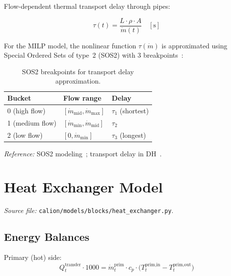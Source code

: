\documentclass[a4paper,12pt]{article}
\begin{document}
Flow-dependent thermal transport delay through pipes:

\begin{equation}
  \tau(t) = \frac{L \cdot \rho \cdot A}{\dot{m}(t)}
  \quad [\text{s}]
  \tag{PH-7}
  \label{eq:ph7}
\end{equation}

For the MILP model, the nonlinear function $\tau(\dot{m})$ is approximated using Special
Ordered Sets of type~2 (SOS2) with 3 breakpoints~\cite{Williams2013}:

\begin{table}[h!]
  \centering
  \caption{SOS2 breakpoints for transport delay approximation.}
  \begin{tabular}{@{}lll@{}}
    \toprule
    Bucket & Flow range & Delay \\
    \midrule
    0 (high flow)   & $[\dot{m}_{\text{mid}}, \dot{m}_{\text{max}}]$ & $\tau_1$ (shortest) \\
    1 (medium flow) & $[\dot{m}_{\text{min}}, \dot{m}_{\text{mid}}]$ & $\tau_2$ \\
    2 (low flow)    & $[0, \dot{m}_{\text{min}}]$                    & $\tau_3$ (longest) \\
    \bottomrule
  \end{tabular}
  \label{tab:sos2}
\end{table}

\noindent\textit{Reference:} SOS2 modeling~\cite{Beale1970}; transport delay in
DH~\cite{Schweiger2017}.

\section{Heat Exchanger Model}
\label{sec:hx}

\textit{Source file:} \texttt{calion/models/blocks/heat\_exchanger.py}.

\subsection{Energy Balances}

\noindent Primary (hot) side:
\begin{equation}
  Q^{\text{transfer}}_{t} \cdot 1000
  = \dot{m}^{\text{prim}}_{t} \cdot c_p
    \cdot \bigl(T^{\text{prim,in}}_{t} - T^{\text{prim,out}}_{t}\bigr)
  \tag{HX-1}
  \label{eq:hx1}
\end{equation}
\end{document}
